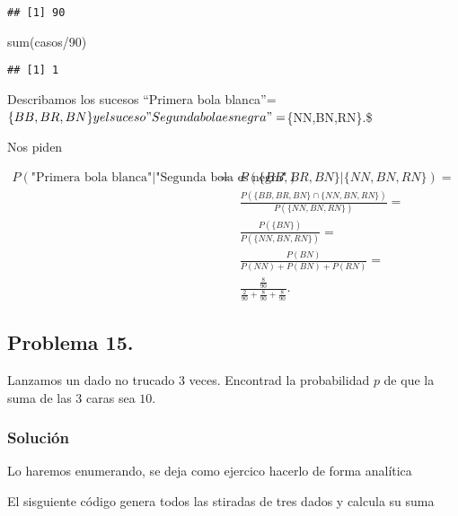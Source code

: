 \documentclass[
]{article}
\newenvironment{Shaded}{\begin{snugshade}}{\end{snugshade}}
\newcommand{\DecValTok}[1]{\textcolor[rgb]{0.00,0.00,0.81}{#1}}
\newcommand{\FunctionTok}[1]{\textcolor[rgb]{0.00,0.00,0.00}{#1}}
\newcommand{\NormalTok}[1]{#1}
\newcommand{\SpecialCharTok}[1]{\textcolor[rgb]{0.00,0.00,0.00}{#1}}
\begin{document}
\begin{verbatim}
## [1] 90
\end{verbatim}

\begin{Shaded}
\begin{Highlighting}[]
\FunctionTok{sum}\NormalTok{(casos}\SpecialCharTok{/}\DecValTok{90}\NormalTok{)}
\end{Highlighting}
\end{Shaded}

\begin{verbatim}
## [1] 1
\end{verbatim}

Describamos los sucesos ``Primera bola
blanca''=\(\{BB,BR,BN\} y el suceso "Segunda bola es negra"=\)\{NN,BN,RN\}.\$

Nos piden

\begin{eqnarray*}
P(\mbox{"Primera bola blanca"}|\mbox{"Segunda bola es negra"})&=& P(\{BB,BR,BN\}|\{NN,BN,RN\})=\\
&&\frac{P\left(\{BB,BR,BN\}\cap\{NN,BN,RN\}\right)}{P\left(\{NN,BN,RN\}\right)}=\\
&&\frac{P\left(\{BN\}\right)}{P\left(\{NN,BN,RN\}\right)}=\\
&& \frac{P(BN)}{P(NN)+P(BN)+P(RN)}=\\ 
&&\frac{\frac{8}{90}}{\frac{2}{90}+\frac{8}{90}+\frac{8}{90}}.
\end{eqnarray*}

\hypertarget{problema-15.}{%
\subsection{Problema 15.}\label{problema-15.}}

Lanzamos un dado no trucado 3 veces. Encontrad la probabilidad \(p\) de
que la suma de las 3 caras sea \(10\).

\hypertarget{soluciuxf3n-15}{%
\subsubsection{Solución}\label{soluciuxf3n-15}}

Lo haremos enumerando, se deja como ejercico hacerlo de forma analítica

El sisguiente código genera todos las stiradas de tres dados y calcula
su suma
\end{document}
